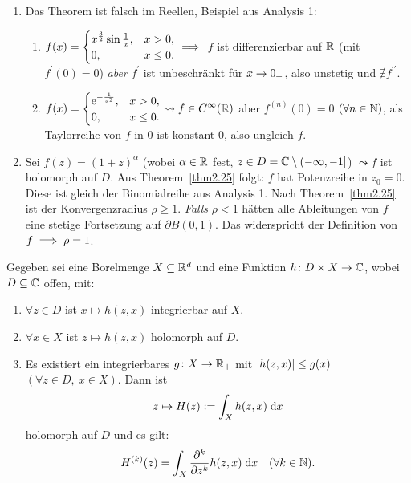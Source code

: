 \documentclass[a4paper,twoside,DIV15,BCOR12mm]{scrbook}
\begin{document}
\begin{bsp}\label{bsp2.26}\begin{enumerate}
\item Das Theorem ist falsch im Reellen, Beispiel aus Analysis 1:
\begin{enumerate}
\item $\displaystyle f(x)=\begin{cases}x^{\frac{3}{2}}\sin\frac{1}{x},&x>0,\\0,&x\leq 0.\end{cases}\implies$ $f$ ist differenzierbar auf $\mathbb{R}$ (mit $f^\prime(0) = 0$) \textit{aber} $f^\prime$ ist unbeschränkt für $x\rightarrow 0_+$, also unstetig und $\nexists f^{\prime\prime}$.

\item $\displaystyle f(x)=\begin{cases}\mathrm{e}^{-\frac{1}{x^2}},&x>0,\\0,&x\leq0.\end{cases}\leadsto f\in C^\infty(\mathbb{R})$ aber $f^{(n)}(0)=0$ $(\forall n\in\mathbb{N})$, als Taylorreihe von $f$ in $0$ ist konstant 0, also ungleich $f$.
\end{enumerate}
\item Sei $f(z)=(1+z)^\alpha$ (wobei $\alpha\in\mathbb{R}$ fest, $z\in D = \mathbb{C}\setminus(-\infty,-1]$) $\leadsto f$ ist holomorph auf $D$. Aus Theorem~\ref{thm2.25} folgt: $f$ hat Potenzreihe in $z_0=0$. Diese ist gleich der Binomialreihe aus Analysis 1. Nach Theorem~\ref{thm2.25} ist der Konvergenzradius $\rho\geq 1$. \textit{Falls} $\rho <1$ hätten alle Ableitungen von $f$ eine stetige Fortsetzung auf $\partial B(0,1)$. Das widerspricht der Definition von $f\implies\rho=1$.
\end{enumerate}
\end{bsp}

\begin{kor}\label{kor2.27}
Gegeben sei eine Borelmenge $X\subseteq\mathbb{R}^d$ und eine Funktion $h\colon D\times X\to\mathbb{C}$, wobei $D\subseteq\mathbb{C}$ offen, mit:
\begin{enumerate}
\item $\forall z\in D$ ist $x\mapsto h(z,x)$ integrierbar auf $X$.
\item $\forall x\in X$ ist $z\mapsto h(z,x)$ holomorph auf $D$.
\item Es existiert ein integrierbares $g\colon X\to\mathbb{R}_+$ mit $\left\lvert h(z,x)\right\lvert\leq g(x)$ $(\forall z\in D,\ x\in X)$. Dann ist
\[z\mapsto H(z):= \int_{X}^{}{h(z,x)}\;\mathrm{d} x\]
holomorph auf $D$ und es gilt:
\[H^{(k)}(z)=\int_{X}^{}{\frac{\partial^k}{\partial z^k}h(z,x)}\;\mathrm{d} x\quad(\forall k\in\mathbb{N}).\]
\end{enumerate}
\end{kor}
\end{document}
